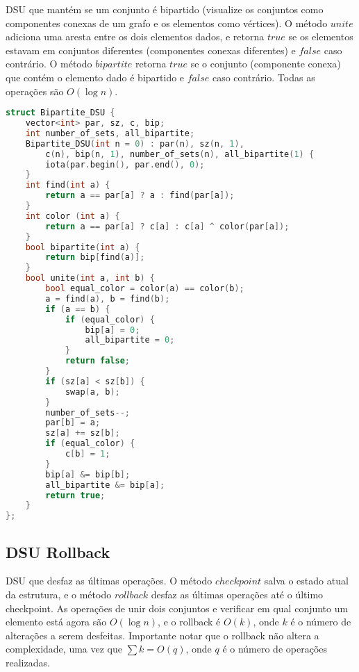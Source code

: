 \documentclass[11pt, a4paper, oneside]{book}
\begin{document}
DSU que mantém se um conjunto é bipartido (visualize os conjuntos como componentes conexas de um grafo e os elementos como vértices). O método $unite$ adiciona uma aresta entre os dois elementos dados, e retorna $true$ se os elementos estavam em conjuntos diferentes (componentes conexas diferentes) e $false$ caso contrário. O método $bipartite$ retorna $true$ se o conjunto (componente conexa) que contém o elemento dado é bipartido e $false$ caso contrário. Todas as operações são $O(\log n)$.
\hfill

\begin{multicols}{2}
\begin{lstlisting}[language=C++]
struct Bipartite_DSU {
    vector<int> par, sz, c, bip;
    int number_of_sets, all_bipartite;
    Bipartite_DSU(int n = 0) : par(n), sz(n, 1),
        c(n), bip(n, 1), number_of_sets(n), all_bipartite(1) {
        iota(par.begin(), par.end(), 0);
    }
    int find(int a) {
        return a == par[a] ? a : find(par[a]);
    }
    int color (int a) {
        return a == par[a] ? c[a] : c[a] ^ color(par[a]);
    }
    bool bipartite(int a) {
        return bip[find(a)];
    }
    bool unite(int a, int b) {
        bool equal_color = color(a) == color(b);
        a = find(a), b = find(b);
        if (a == b) {
            if (equal_color) {
                bip[a] = 0;
                all_bipartite = 0;
            }
            return false;
        }
        if (sz[a] < sz[b]) {
            swap(a, b);
        }
        number_of_sets--;
        par[b] = a;
        sz[a] += sz[b];
        if (equal_color) {
            c[b] = 1;
        }
        bip[a] &= bip[b];
        all_bipartite &= bip[a];
        return true;
    }
};
\end{lstlisting}
\end{multicols}

\hfill

\subsection{DSU Rollback}


DSU que desfaz as últimas operações. O método $checkpoint$ salva o estado atual da estrutura, e o método $rollback$ desfaz as últimas operações até o último checkpoint. As operações de unir dois conjuntos e verificar em qual conjunto um elemento está agora são $O(\log n)$, e o rollback é $O(k)$, onde $k$ é o número de alterações a serem desfeitas. Importante notar que o rollback não altera a complexidade, uma vez que $\sum k = O(q)$, onde $q$ é o número de operações realizadas.
\hfill
\end{document}

